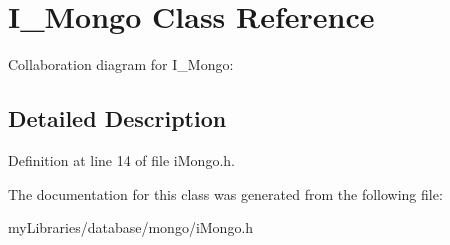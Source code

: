 \hypertarget{classI__Mongo}{}\section{I\+\_\+\+Mongo Class Reference}
\label{classI__Mongo}


Collaboration diagram for I\+\_\+\+Mongo\+:


\subsection{Detailed Description}


Definition at line 14 of file i\+Mongo.\+h.



The documentation for this class was generated from the following file\+:\begin{DoxyCompactItemize}
\item 
my\+Libraries/database/mongo/i\+Mongo.\+h\end{DoxyCompactItemize}
